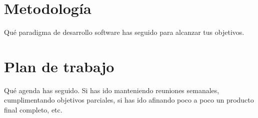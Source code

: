 \section{Metodología}
\label{sec:metodologia}




Qué paradigma de desarrollo software has seguido para alcanzar tus objetivos.

\section{Plan de trabajo}
\label{sec:plantrabajo}

Qué agenda has seguido. Si has ido manteniendo reuniones semanales, cumplimentando objetivos parciales, si has ido afinando poco a poco un producto final completo, etc.

